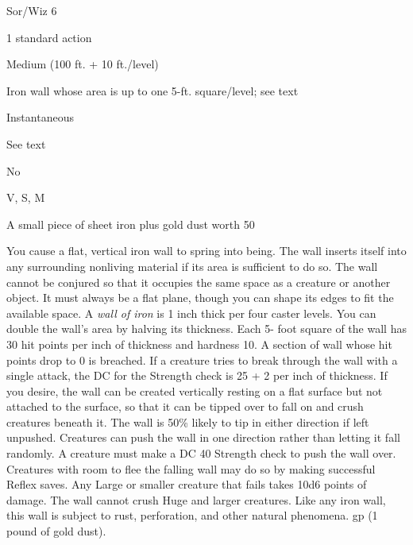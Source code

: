 
\begin{description*}
\item[Level:] Sor/Wiz 6
\item[Casting Time:] 1 standard action
\item[Range:] Medium (100 ft. + 10 ft./level)
\item[Effect:] Iron wall whose area is up to one 5-ft. square/level; see text
\item[Duration:] Instantaneous
\item[Saving Throw:] See text
\item[Spell Resistance:] No
\item[Components:] V, S, M
\item[Arcane Material Component:] A small piece of sheet iron plus gold dust worth 50
\end{description*}

You cause a flat, vertical iron wall to spring into being. The wall inserts itself
into any surrounding nonliving material if its area is sufficient to do so. The
wall cannot be conjured so that it occupies the same space as a creature or another
object. It must always be a flat plane, though you can shape its edges to fit the
available space.
A \textit{wall of iron} is 1 inch thick per four caster levels. You can double
the wall's area by halving its thickness. Each 5- foot square of the wall has 30
hit points per inch of thickness and hardness 10. A section of wall whose hit points
drop to 0 is breached. If a creature tries to break through the wall with a single
attack, the DC for the Strength check is 25 + 2 per inch of thickness.
If you desire, the wall can be created vertically resting on a flat surface but
not attached to the surface, so that it can be tipped over to fall on and crush
creatures beneath it. The wall is 50\% likely to tip in either direction if left
unpushed. Creatures can push the wall in one direction rather than letting it fall
randomly. A creature must make a DC 40 Strength check to push the wall over. Creatures
with room to flee the falling wall may do so by making successful Reflex saves.
Any Large or smaller creature that fails takes 10d6 points of damage. The wall
cannot crush Huge and larger creatures.
Like any iron wall, this wall is subject to rust, perforation, and other natural
phenomena.
gp (1 pound of gold dust).